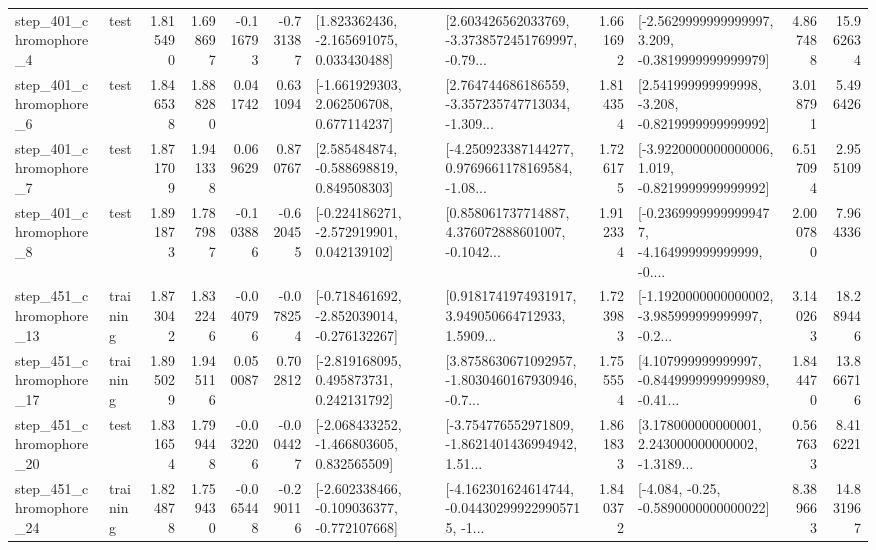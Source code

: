 \begin{tabular}{llrrrrllrlrr}
   step\_401\_chromophore\_4 &      test &      1.815490 &    1.698697 &     -0.116793 & -0.731387 &    [1.823362436, -2.165691075, 0.033430488] &  [2.603426562033769, -3.3738572451769997, -0.79... &       1.661692 &  [-2.5629999999999997, 3.209, -0.3819999999999979] &            4.867488 &         15.962634 \\
   step\_401\_chromophore\_6 &      test &      1.846538 &    1.888280 &      0.041742 &  0.631094 &    [-1.661929303, 2.062506708, 0.677114237] &  [2.764744686186559, -3.357235747713034, -1.309... &       1.814354 &   [2.541999999999998, -3.208, -0.8219999999999992] &            3.018791 &          5.496426 \\
   step\_401\_chromophore\_7 &      test &      1.871709 &    1.941338 &      0.069629 &  0.870767 &    [2.585484874, -0.588698819, 0.849508303] &  [-4.250923387144277, 0.9769661178169584, -1.08... &       1.726175 &  [-3.9220000000000006, 1.019, -0.8219999999999992] &            6.517094 &          2.955109 \\
   step\_401\_chromophore\_8 &      test &      1.891873 &    1.787987 &     -0.103886 & -0.620455 &   [-0.224186271, -2.572919901, 0.042139102] &  [0.858061737714887, 4.376072888601007, -0.1042... &       1.912334 &  [-0.23699999999999477, -4.164999999999999, -0.... &            2.000780 &          7.964336 \\
  step\_451\_chromophore\_13 &  training &      1.873042 &    1.832246 &     -0.040796 & -0.078254 &  [-0.718461692, -2.852039014, -0.276132267] &  [0.9181741974931917, 3.949050664712933, 1.5909... &       1.723983 &  [-1.1920000000000002, -3.985999999999997, -0.2... &            3.140263 &         18.289446 \\
  step\_451\_chromophore\_17 &  training &      1.895029 &    1.945116 &      0.050087 &  0.702812 &    [-2.819168095, 0.495873731, 0.242131792] &  [3.8758630671092957, -1.8030460167930946, -0.7... &       1.755554 &  [4.107999999999997, -0.8449999999999989, -0.41... &            1.844470 &         13.866716 \\
  step\_451\_chromophore\_20 &      test &      1.831654 &    1.799448 &     -0.032206 & -0.004427 &   [-2.068433252, -1.466803605, 0.832565509] &  [-3.754776552971809, -1.8621401436994942, 1.51... &       1.861833 &  [3.178000000000001, 2.243000000000002, -1.3189... &            0.567633 &          8.416221 \\
  step\_451\_chromophore\_24 &  training &      1.824878 &    1.759430 &     -0.065448 & -0.290116 &  [-2.602338466, -0.109036377, -0.772107668] &  [-4.162301624614744, -0.044302999229905715, -1... &       1.840372 &               [-4.084, -0.25, -0.5890000000000022] &            8.389663 &         14.831967 \\

\end{tabular}
